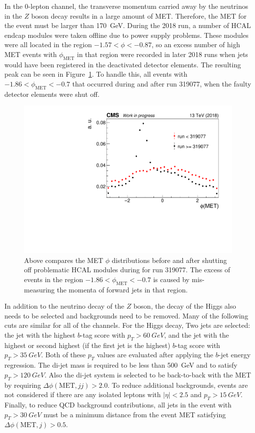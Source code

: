 In the 0-lepton channel, the transverse momentum carried away by the neutrinos
in the $Z$ boson decay results in a large amount of MET.
Therefore, the MET for the event must be larger than \SI{170}{GeV}.
During the 2018 run, a number of HCAL endcap modules were taken offline
due to power supply problems.
These modules were all located in the region $-1.57 < \phi < -0.87$,
so an excess number of high MET events with $\phi_\mathrm{MET}$ in that region were recorded
in later 2018 runs when jets would have been registered in the deactivated detector elements.
The resulting peak can be seen in Figure~\ref{fig:met-peak}.
To handle this, all events with $-1.86 < \phi_\mathrm{MET} < -0.7$ that occurred
during and after run 319077, when the faulty detector elements were shut off.
\begin{figure}
  \centering
  \includegraphics[width=0.8\linewidth]{figures/METPhi319077.pdf}
  \caption[MET $\phi$ distribution before and after shutting off HCAL modules]{
    Above compares the MET $\phi$ distributions before and after shutting off
    problematic HCAL modules during for run 319077.
    The excess of events in the region $-1.86 < \phi_\mathrm{MET} < -0.7$
    is caused by mis-measuring the momenta of forward jets in that region.
  }
  \label{fig:met-peak}
\end{figure}

In addition to the neutrino decay of the $Z$ boson,
the \bb decay of the Higgs also needs to be selected and backgrounds need to be removed.
Many of the following cuts are similar for all of the channels.
For the Higgs decay, Two jets are selected:
the jet with the highest $b$-tag score with $p_T > \SI{60}{GeV}$,
and the jet with the highest or second highest (if the first jet is the highest)
$b$-tag score with $p_T > \SI{35}{GeV}$.
Both of these $p_T$ values are evaluated after applying the $b$-jet energy regression.
The di-jet mass is required to be less than \SI{500}{GeV} and to satisfy $p_T > \SI{120}{GeV}$.
Also the di-jet system is selected to be back-to-back with the MET
by requiring $\Delta\phi(\mathrm{MET}, jj) > 2.0$.
To reduce additional backgrounds, events are not considered if there are any isolated leptons
with $|\eta| < 2.5$ and $p_T > \SI{15}{GeV}$.
Finally, to reduce QCD background contributions, all jets in the event with $p_T > \SI{30}{GeV}$
must be a minimum distance from the event MET satisfying $\Delta \phi(\mathrm{MET}, j) > 0.5$.


